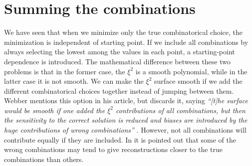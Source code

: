 \documentclass[twoside,english]{uiofysmaster}
\begin{document}
\section{Summing the combinations}
\label{sec:combinatorics-sum_all_contributions}
We have seen that when we minimize only the true combinatorical choice, the minimization is independent of starting point. If we include all combinations by always selecting the lowest among the values in each point, a starting-point dependence is introduced. The mathematical difference between these two problems is that in the former case, the $\xi^2$ is a smooth polynomial, while in the latter case it is not smooth. We can make the $\xi^2$ surface smooth if we add the different combinatorical choices together instead of jumping between them. Webber mentions this option in his article, but discards it, saying {\it ``[t]he surface would be smooth if one added the $\xi^2$ contributions of all combinations,  but then the sensitivity to the correct solution is reduced and biases are introduced by the huge contributions of wrong combinations''} \cite[p.\ 6]{Webber:2009vm}. However, not all combinations will contribute equally if they are included. In \cite{Gripaios:2011jm} it is pointed out that some of the wrong combinations may tend to give reconstructions closer to the true combinations than others. 
\end{document}
